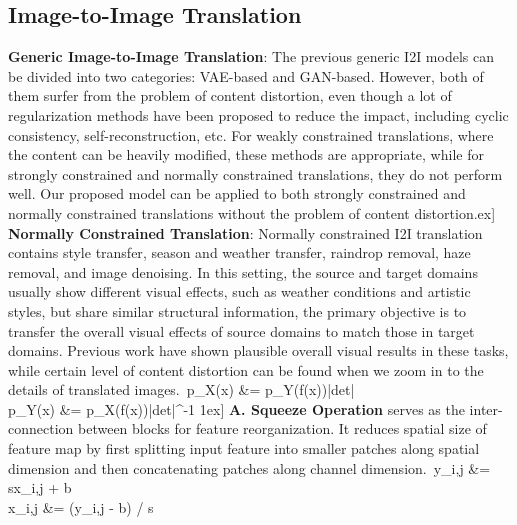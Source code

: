 \documentclass[runningheads]{llncs}
\begin{document}
\subsection{Image-to-Image Translation}
\noindent\textbf{Generic Image-to-Image Translation}: The previous generic I2I models can be divided into two categories: VAE-based\cite{ma2018exemplar,zhu2017multimodal,lee2018diverse,liu2017unsupervised,huang2018multimodal,wu2019transgaga} and GAN-based\cite{park2020contrastive,zhu2017unpaired,kim2017learning,yi2017dualgan,chen2020reusing}. However, both of them surfer from the problem of content distortion, even though a lot of regularization methods have been proposed to reduce the impact, including cyclic consistency, self-reconstruction, etc. For weakly constrained translations, where the content can be heavily modified, these methods are appropriate, while for strongly constrained and normally constrained translations, they do not perform well. Our proposed model can be applied to both strongly constrained and normally constrained translations without the problem of content distortion.\1ex]
\noindent\textbf{Normally Constrained Translation}: Normally constrained I2I translation contains style transfer\cite{gatys2015texture,huang2017arbitrary,sheng2018avatar,gu2018arbitrary,wang2020diversified,chen2016fast,li2017universal,an2020ultrafast}, season and weather transfer\cite{li2021weather}, raindrop removal\cite{qian2018attentive,shao2021selective}, haze removal\cite{engin2018cycle,anvari2020dehaze,fahim2021single}, and image denoising\cite{guo2019toward,shan2019residual,lehtinen2018noise2noise}. In this setting, the source and target domains usually show different visual effects, such as weather conditions and artistic styles, but share similar structural information, the primary objective is to transfer the overall visual effects of source domains to match those in target domains. Previous work have shown plausible overall visual results in these tasks, while certain level of content distortion can be found when we zoom in to the details of translated images.\
p_X(x) &= p_Y(f(x))|det|\\
  p_Y(x) &= p_X(f(x))|det\frac{\partial f(x)}{\partial x}|^{-1}
1ex]
\noindent\textbf{A. Squeeze Operation} serves as the inter-connection between blocks for feature reorganization. It reduces spatial size of feature map by first splitting input feature into smaller patches along spatial dimension and then concatenating patches along channel dimension.\
      y_{i,j} &= s\odot x_{i,j} + b\\
      x_{i,j} &= (y_{i,j} - b) / s
\end{document}
